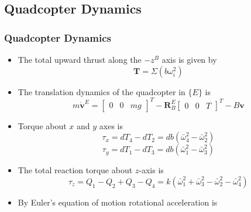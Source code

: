 \documentclass[10pt]{beamer}
\begin{document}
\subsection*{Quadcopter Dynamics}
\begin{frame}
	\frametitle{Quadcopter Dynamics}
	\begin{itemize}
		\item The total upward thrust along the $-z^{B}$ axis is given by
		      \begin{equation}
			      \mathbf{T} = \Sigma (b {\omega}_{i}^2)
		      \end{equation}
		\pause
		\vspace*{-0.4 cm}
		\item The translation dynamics of the quadcopter in $\{E\}$ is
		      \begin{equation}
			      m\dot{\mathbf{v}}^{E}=\begin{bmatrix}
				      0 & 0 & m g
			      \end{bmatrix}^{T}-\mathbf{R}_{B}^{E}\begin{bmatrix}
				      0 & 0 & T
			      \end{bmatrix}^{T} - B\mathbf{v}\label{eq:trans_dynamics}
		      \end{equation}
			  \pause
			  \vspace*{-0.4 cm}
		\item Torque about $x$ and $y$ axes is
		      \begin{equation}
			      \tau_{x}=d T_{4}-d T_{2} = db(\bar{\omega}_{4}^{2}-\bar{\omega}_{2}^{2})
		      \end{equation}
		      \begin{equation}
			      \tau_{y}=d T_{1}-d T_{3} = db(\bar{\omega}_{1}^{2}-\bar{\omega}_{3}^{2})
		      \end{equation}
			  \pause
			  \vspace*{-0.4 cm}
		\item The total reaction torque about $z$-axis is
		      \begin{equation}
			      \tau_{z} =Q_{1}-Q_{2}+Q_{3}-Q_{4}=k\left(\bar{\omega}_{1}^{2}+\bar{\omega}_{3}^{2}-\bar{\omega}_{2}^{2}-\bar{\omega}_{4}^{2}\right)\label{eq:react_torque_z}
		      \end{equation}
			  \pause
			  \vspace*{-0.4 cm}
		\item By Euler's equation of motion rotational acceleration is
		      \begin{equation}

\end{equation}
\end{itemize}
\end{frame}
\end{document}
